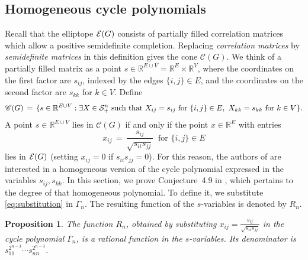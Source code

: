 \documentclass[a4paper, 11pt, twoside]{article}
\newcommand{\R}{\mathbb{R}}
\newcommand{\MCscr}{{\mathscr {C}}}
\theoremstyle{plain}
\newtheorem{proposition}[theorem]{Proposition}
\begin{document}
\subsection{Homogeneous cycle polynomials}\label{sec:cyclehomogeneous}

Recall that the elliptope ${\cal E}(G)$ consists of partially filled correlation matrices which allow a positive semidefinite completion. Replacing \emph{correlation matrices} by \emph{semidefinite matrices} in this definition gives the cone ${\MCscr}(G)$. 
We think of a partially filled  matrix as a point  $s\in \mathbb{R}^{E\cup V}=\R^E\times \R^V$, 
where   the coordinates on the first factor are $s_{ij}$, indexed by the edges $\{i,j\}\in E$, and 
the coordinates on the second factor are $s_{kk}$ for $k\in V$. 
Define
\begin{align}\label{eq:coneCG}
 \MCscr(G) \, = \, \{ s \in \mathbb{R}^{E\cup V}  :  \exists X \in {\cal S}^n_+ \text{ such that } 
X_{ij}=s_{ij} \text{ for } \{i,j\}\in E,\ X_{kk}=s_{kk}\text{ for } k\in V\}.\end{align}
A point $s\in\R^{E\cup V}$ lies in $\MCscr (G)$ if and only if the point $x\in \R^E$ with entries 
\begin{equation} \label{eq:substitution} 
x_{ij} \, = \, \frac{s_{ij}}{\sqrt{s_{ii}s_{jj}}}  \ \text{ for } \{i,j\}\in E
\end{equation}
lies in ${\cal E}(G)$  (setting $x_{ij}=0$ if $s_{ii}s_{jj}=0$). For this reason, the authors of \cite{Sturmfels2010MultivariateGaussians} are interested in a homogeneous version of the cycle polynomial expressed in the variables $s_{ij}, s_{kk}$. In this section, we prove Conjecture~4.9 in \cite{Sturmfels2010MultivariateGaussians}, which pertains to the degree of that homogeneous polynomial. To define it, we substitute \eqref{eq:substitution} in $\Gamma_n$. The resulting function of the $s$-variables is denoted by $R_n$. 

\begin{proposition} \label{prop:Rrational}
    The function $R_n$, obtained by substituting $x_{ij} = \tfrac{s_{ij}}{\sqrt{s_{ii}s_{jj}}}$ in the cycle polynomial $\Gamma_n$, is a rational function in the $s$-variables. Its denominator is $s_{11}^{2^{n-3}} \cdots s_{nn}^{2^{n-3}}$.
\end{proposition}
\end{document}
